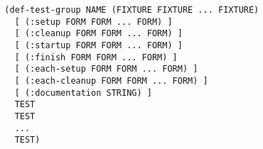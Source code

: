 \begin{verbatim}
  (def-test-group NAME (FIXTURE FIXTURE ... FIXTURE)
    [ (:setup FORM FORM ... FORM) ]
    [ (:cleanup FORM FORM ... FORM) ]
    [ (:startup FORM FORM ... FORM) ]
    [ (:finish FORM FORM ... FORM) ]
    [ (:each-setup FORM FORM ... FORM) ]
    [ (:each-cleanup FORM FORM ... FORM) ]
    [ (:documentation STRING) ]
    TEST
    TEST
    ...
    TEST)
\end{verbatim}

